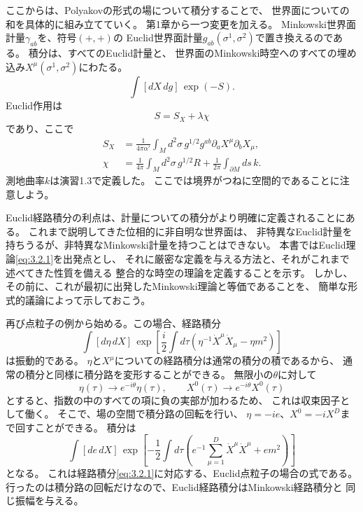 \label{sec:3.2}

ここからは、Polyakovの形式の場について積分することで、
世界面についての和を具体的に組み立てていく。
第1章から一つ変更を加える。
Minkowski世界面計量$\gamma_{ab}$を、符号$(+,+)$の
Euclid世界面計量$g_{ab}(\sigma^1,\sigma^2)$で置き換えるのである。
積分は、すべてのEuclid計量と、
世界面のMinkowski時空へのすべての埋め込み$X^\mu(\sigma^1,\sigma^2)$にわたる。
\begin{equation}
\int[dX\,dg]\,\exp(-S).
\tag{3.2.1}\label{eq:3.2.1}
\end{equation}
Euclid作用は
\begin{equation}
S=S_X+\lambda\chi
\tag{3.2.2}\label{eq:3.2.2}
\end{equation}
であり、ここで
\begin{align}
S_X&=\frac{1}{4\pi\alpha'}\int_M d^2\sigma\,g^{1/2}g^{ab}
       \partial_aX^\mu\partial_bX_\mu,
\tag{3.2.3a}\label{eq:3.2.3a}\\
\chi&=\frac{1}{4\pi}\int_M d^2\sigma\,g^{1/2}R
       +\frac{1}{2\pi}\int_{\partial M}ds\,k.
\tag{3.2.3b}\label{eq:3.2.3b}
\end{align}
測地曲率$k$は演習1.3で定義した。
ここでは境界がつねに空間的であることに注意しよう。

Euclid経路積分の利点は、計量についての積分がより明確に定義されることにある。
これまで説明してきた位相的に非自明な世界面は、
非特異なEuclid計量を持ちうるが、非特異なMinkowski計量を持つことはできない。
本書ではEuclid理論\eqref{eq:3.2.1}を出発点とし、
それに厳密な定義を与える方法と、それがこれまで述べてきた性質を備える
整合的な時空の理論を定義することを示す。
しかし、その前に、これが最初に出発したMinkowski理論と等価であることを、
簡単な形式的議論によって示しておこう。

再び点粒子の例から始める。この場合、経路積分
\begin{equation}
\int[d\eta\,dX]\,
\exp\left[\frac{i}{2}\int d\tau
\left(\eta^{-1}\dot X^\mu\dot X_\mu-\eta m^2\right)\right]
\tag{3.2.4}\label{eq:3.2.4}
\end{equation}
は振動的である。
$\eta$と$X^\mu$についての経路積分は通常の積分の積であるから、
通常の積分と同様に積分路を変形することができる。
無限小の$\theta$に対して
\begin{equation}
\eta(\tau)\longrightarrow e^{-i\theta}\eta(\tau),\qquad
X^0(\tau)\longrightarrow e^{-i\theta}X^0(\tau)
\tag{3.2.5}\label{eq:3.2.5}
\end{equation}
とすると、指数の中のすべての項に負の実部が加わるため、
これは収束因子として働く。
そこで、場の空間で積分路の回転を行い、
$\eta=-ie$、$X^0=-iX^D$まで回すことができる。
積分は
\begin{equation}
\int[de\,dX]\,
\exp\left[-\frac12\int d\tau
\left(e^{-1}\sum_{\mu=1}^{D}\dot X^\mu\dot X^\mu+em^2\right)\right]
\tag{3.2.6}\label{eq:3.2.6}
\end{equation}
となる。
これは経路積分\eqref{eq:3.2.1}に対応する、Euclid点粒子の場合の式である。
行ったのは積分路の回転だけなので、Euclid経路積分はMinkowski経路積分と
同じ振幅を与える。

